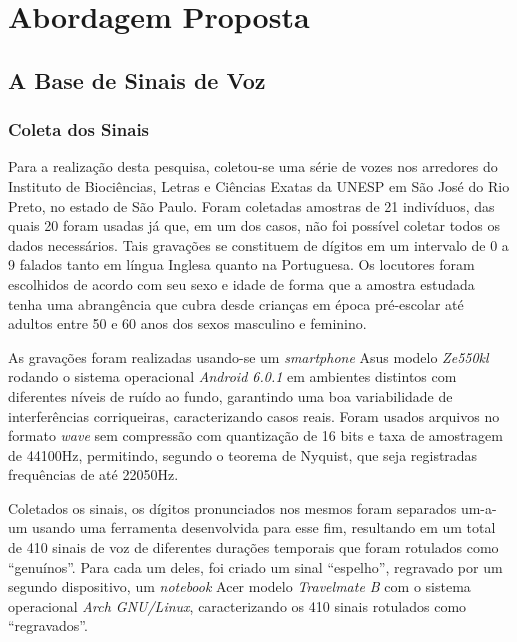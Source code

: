 \chapter{Abordagem Proposta} \label{chap:propApproach}
	\section{A Base de Sinais de Voz}
	    \subsection{Coleta dos Sinais}
		\par Para a realização desta pesquisa, coletou-se uma série de vozes nos arredores do Instituto de Biociências, Letras e Ciências Exatas da UNESP em São José do Rio Preto, no estado de São Paulo. Foram coletadas amostras de 21 indivíduos, das quais 20 foram usadas já que, em um dos casos, não foi possível coletar todos os dados necessários. Tais gravações se constituem de dígitos em um intervalo de 0 a 9 falados tanto em língua Inglesa quanto na Portuguesa. Os locutores foram escolhidos de acordo com seu sexo e idade de forma que a amostra estudada tenha uma abrangência que cubra desde crianças em época pré-escolar até adultos entre 50 e 60 anos dos sexos masculino e feminino.
					
		\par As gravações foram realizadas usando-se um \textit{smartphone} Asus modelo \textit{Ze550kl} rodando o sistema operacional \textit{Android 6.0.1} em ambientes distintos com diferentes níveis de ruído ao fundo, garantindo uma boa variabilidade de interferências corriqueiras, caracterizando casos reais. Foram usados arquivos no formato \textit{wave} sem compressão com quantização de 16 bits e taxa de amostragem de 44100Hz, permitindo, segundo o teorema de Nyquist, que seja registradas frequências de até 22050Hz.
		
		\par Coletados os sinais, os dígitos pronunciados nos mesmos foram separados um-a-um usando uma ferramenta desenvolvida para esse fim, resultando em um total de 410 sinais de voz de diferentes durações temporais que foram rotulados como ``genuínos''. Para cada um deles, foi criado um sinal ``espelho'',  regravado por um segundo dispositivo, um \textit{notebook} Acer modelo  \textit{Travelmate B} com o sistema operacional \textit{Arch GNU/Linux}, caracterizando os 410 sinais rotulados como ``regravados''.

